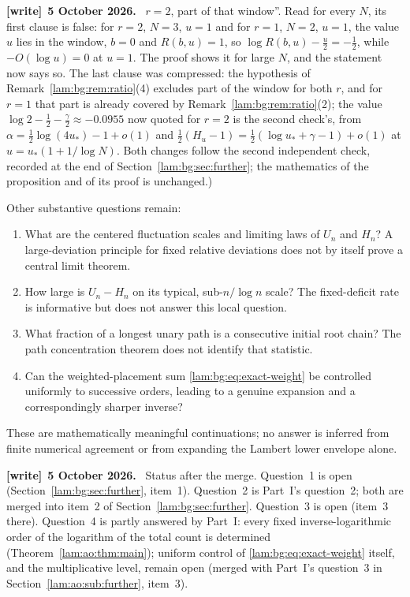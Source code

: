 \documentclass[11pt,a4paper]{article}
\numberwithin{equation}{section}
\theoremstyle{remark}
\newenvironment{writenote}[1][]{\par\smallskip\begingroup\small
 \noindent\textbf{[write]}\if\relax\detokenize{#1}\relax\else~\textbf{#1.}\fi\ }%
 {\par\endgroup\smallskip}
\begin{document}
\begin{writenote}[5 October 2026]
$r=2$, part of that window''. Read for every $N$, its first clause is false: for $r=2$, $N=3$, $u=1$ and for $r=1$, $N=2$, $u=1$, the value $u$ lies in the window, $b=0$ and $R(b,u)=1$, so $\log R(b,u)-\frac u2=-\frac12$, while $-O(\log u)=0$ at $u=1$. The proof shows it for large $N$, and the statement now says so. The last clause was compressed: the hypothesis of Remark~\ref{lam:bg:rem:ratio}(4) excludes part of the window for both $r$, and for $r=1$ that part is already covered by Remark~\ref{lam:bg:rem:ratio}(2); the value $\log2-\frac12-\frac\gamma2\approx-0.0955$ now quoted for $r=2$ is the second check's, from $\alpha=\frac12\log(4u_*)-1+o(1)$ and $\frac12(H_u-1)=\frac12(\log u_*+\gamma-1)+o(1)$ at $u=u_*(1+1/\log N)$. Both changes follow the second independent check, recorded at the end of Section~\ref{lam:bg:sec:further}; the mathematics of the proposition and of its proof is unchanged.)
\end{writenote}


Other substantive questions remain:
\begin{enumerate}
 \item What are the centered fluctuation scales and limiting laws of $U_n$ and $H_n$? A large-deviation principle for fixed relative deviations does not by itself prove a central limit theorem.
 \item How large is $U_n-H_n$ on its typical, sub-$n/\log n$ scale? The fixed-deficit rate is informative but does not answer this local question.
 \item What fraction of a longest unary path is a consecutive initial root chain? The path concentration theorem does not identify that statistic.
 \item Can the weighted-placement sum \eqref{lam:bg:eq:exact-weight} be controlled uniformly to successive orders, leading to a genuine expansion and a correspondingly sharper inverse?
\end{enumerate}
These are mathematically meaningful continuations; no answer is inferred from finite numerical agreement or from expanding the Lambert lower envelope alone.
\begin{writenote}[5 October 2026]
Status after the merge. Question~1 is open (Section~\ref{lam:bg:sec:further}, item~1). Question~2 is Part~I's question~2; both are merged into item~2 of Section~\ref{lam:bg:sec:further}. Question~3 is open (item~3 there). Question~4 is partly answered by Part~I: every fixed inverse-logarithmic order of the logarithm of the total count is determined (Theorem~\ref{lam:ao:thm:main}); uniform control of \eqref{lam:bg:eq:exact-weight} itself, and the multiplicative level, remain open (merged with Part~I's question~3 in Section~\ref{lam:ao:sub:further}, item~3).
\end{writenote}
\end{document}

